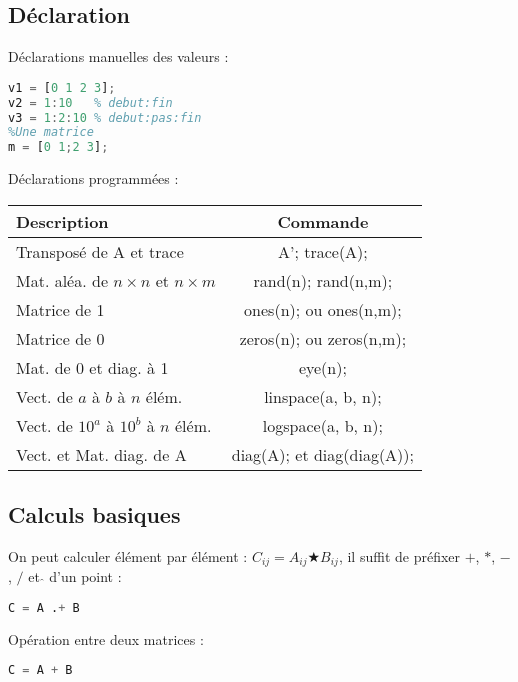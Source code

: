         \subsection{Déclaration}
            Déclarations manuelles des valeurs :
            \begin{lstlisting}[language=Octave]
%Un vecteur
v1 = [0 1 2 3];
v2 = 1:10   % debut:fin
v3 = 1:2:10 % debut:pas:fin
%Une matrice
m = [0 1;2 3];
            \end{lstlisting}
            Déclarations programmées :
            \begin{center}
                \begin{tabular}{| l | c |}
                    \hline
                    Description & Commande \\
                    \hline
                    Transposé de A et trace & A'; trace(A);\\
                    Mat. aléa. de $n\times n$ et $n\times m$ & rand(n); rand(n,m);\\
                    Matrice de 1 & ones(n); ou ones(n,m);\\
                    Matrice de 0 & zeros(n); ou zeros(n,m);\\
                    Mat. de 0 et diag. à 1 & eye(n);\\
                    Vect. de $a$ à $b$ à $n$ élém. & linspace(a, b, n);\\
                    Vect. de $10^a$ à $10^b$ à $n$ élém. & logspace(a, b, n);\\
                    Vect. et Mat. diag. de A & diag(A); et diag(diag(A));\\
                    \hline
                \end{tabular}
            \end{center}
        \subsection{Calculs basiques}
            On peut calculer élément par élément : $C_{ij} = A_{ij} \bigstar B_{ij}$, il suffit de préfixer $+$, $*$, $-$, $/$ et $\hat{ }$ d'un point :
            \begin{lstlisting}[language=Octave]
C = A .+ B
            \end{lstlisting}
            Opération entre deux matrices :
            \begin{lstlisting}[language=Octave]
C = A + B
            \end{lstlisting}
